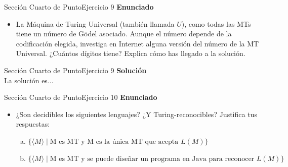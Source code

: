 \documentclass[10pt, envcountsect, presentation, aspectratio=169]{beamer}
\begin{document}

\begin{frame}{Sección Cuarto de Punto}{Ejercicio 9}
    \textbf{Enunciado}
    \begin{itemize}
        \item La Máquina de Turing Universal (también llamada $U$), como todas las MTs tiene un número de Gödel asociado. Aunque el número depende de la codificación elegida, investiga en Internet alguna versión del número de la MT Universal. ¿Cuántos  dígitos tiene? Explica cómo has llegado a la solución.
    \end{itemize}
\end{frame}


\begin{frame}{Sección Cuarto de Punto}{Ejercicio 9}
    \textbf{Solución}\\
    La solución es...
\end{frame}


\begin{frame}{Sección Cuarto de Punto}{Ejercicio 10}
    \textbf{Enunciado}
    \begin{itemize}
        \item ¿Son decidibles los siguientes lenguajes? ¿Y Turing-reconocibles? Justifica tus respuestas:
        \begin{enumerate}[a)]
            \item  $\{\langle M \rangle \mid \mbox{M es MT y  M es la única MT que acepta } L(M)\}$ 
            \item $\{\langle M \rangle \mid \mbox{M es MT  y  se puede diseñar un programa en Java para reconocer } L(M)\}$
        \end{enumerate}
    \end{itemize}
\end{frame}

\end{document}
